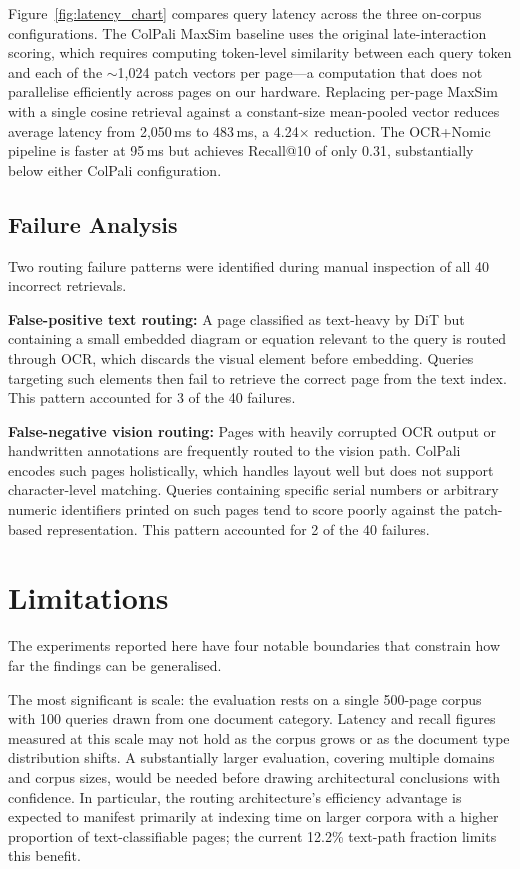 \documentclass[conference]{IEEEtran}
\begin{document}
Figure~\ref{fig:latency_chart} compares query latency across the three on-corpus configurations. The ColPali MaxSim baseline uses the original late-interaction scoring, which requires computing token-level similarity between each query token and each of the $\sim$1,024 patch vectors per page—a computation that does not parallelise efficiently across pages on our hardware. Replacing per-page MaxSim with a single cosine retrieval against a constant-size mean-pooled vector reduces average latency from 2,050\,ms to 483\,ms, a 4.24$\times$ reduction. The OCR+Nomic pipeline is faster at 95\,ms but achieves Recall@10 of only 0.31, substantially below either ColPali configuration.
 
\subsection{Failure Analysis}
Two routing failure patterns were identified during manual inspection of all 40 incorrect retrievals.
 
\textbf{False-positive text routing:} A page classified as text-heavy by DiT but containing a small embedded diagram or equation relevant to the query is routed through OCR, which discards the visual element before embedding. Queries targeting such elements then fail to retrieve the correct page from the text index. This pattern accounted for 3 of the 40 failures.
 
\textbf{False-negative vision routing:} Pages with heavily corrupted OCR output or handwritten annotations are frequently routed to the vision path. ColPali encodes such pages holistically, which handles layout well but does not support character-level matching. Queries containing specific serial numbers or arbitrary numeric identifiers printed on such pages tend to score poorly against the patch-based representation. This pattern accounted for 2 of the 40 failures.
 
\section{Limitations}
 
The experiments reported here have four notable boundaries that constrain how far the findings can be generalised.
 
The most significant is scale: the evaluation rests on a single 500-page corpus with 100 queries drawn from one document category. Latency and recall figures measured at this scale may not hold as the corpus grows or as the document type distribution shifts. A substantially larger evaluation, covering multiple domains and corpus sizes, would be needed before drawing architectural conclusions with confidence. In particular, the routing architecture's efficiency advantage is expected to manifest primarily at indexing time on larger corpora with a higher proportion of text-classifiable pages; the current 12.2\% text-path fraction limits this benefit.
 
\end{document}
